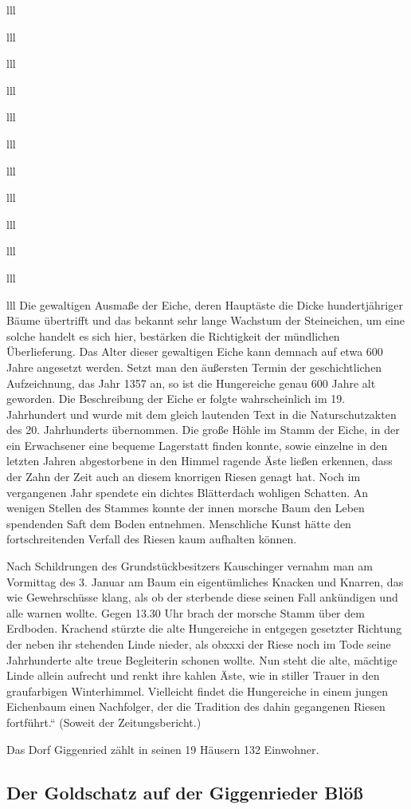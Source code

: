 \documentclass[12pt,a4pager]{book}
\begin{document}
\begin{tabuluar}{lll}
\begin{tabuluar}{lll}
\begin{tabuluar}{lll}
\begin{tabuluar}{lll}
\begin{tabuluar}{lll}
\begin{tabuluar}{lll}
\begin{tabuluar}{lll}
\begin{tabuluar}{lll}
\begin{tabuluar}{lll}
\begin{tabuluar}{lll}
\begin{tabuluar}{lll}
\begin{tabuluar}{lll}
Die gewaltigen Ausmaße der Eiche, deren Hauptäste die Dicke hundertjähriger
Bäume übertrifft und das bekannt sehr lange Wachstum der Steineichen, um eine
solche handelt es sich hier, bestärken die Richtigkeit der mündlichen
Überlieferung. Das Alter dieser gewaltigen Eiche kann demnach auf etwa 600 Jahre
angesetzt werden. Setzt man den äußersten Termin der geschichtlichen
Aufzeichnung, das Jahr 1357 an, so ist die Hungereiche genau 600 Jahre alt
geworden. Die Beschreibung der Eiche er folgte wahrscheinlich im 19. Jahrhundert
und wurde mit dem gleich lautenden Text in die Naturschutzakten des 20.
Jahrhunderts übernommen. Die große Höhle im Stamm der Eiche, in der ein
Erwachsener eine bequeme Lagerstatt finden konnte, sowie einzelne in den letzten
Jahren abgestorbene in den Himmel ragende Äste ließen erkennen, dass der Zahn
der Zeit auch an diesem knorrigen Riesen genagt hat. Noch im vergangenen Jahr
spendete ein dichtes Blätterdach wohligen Schatten. An wenigen Stellen des
Stammes konnte der innen morsche Baum den Leben spendenden Saft dem Boden
entnehmen. Menschliche Kunst hätte den fortschreitenden Verfall des Riesen kaum
aufhalten können.

Nach Schildrungen des Grundstückbesitzers Kauschinger vernahm man am Vormittag
des 3. Januar am Baum ein eigentümliches Knacken und Knarren, das wie
Gewehrschüsse klang, als ob der sterbende diese seinen Fall ankündigen und alle
warnen wollte. Gegen 13.30 Uhr brach der morsche Stamm über dem Erdboden.
Krachend stürzte die alte Hungereiche in entgegen gesetzter Richtung der neben
ihr stehenden Linde nieder, als obxxxi der Riese noch im Tode seine Jahrhunderte
alte treue Begleiterin schonen wollte. Nun steht die alte, mächtige Linde allein
aufrecht und renkt ihre kahlen Äste, wie in stiller Trauer in den graufarbigen
Winterhimmel. Vielleicht findet die Hungereiche in einem jungen Eichenbaum einen
Nachfolger, der die Tradition des dahin gegangenen Riesen fortführt.“ (Soweit
der Zeitungsbericht.)

Das Dorf Giggenried zählt in seinen 19 Häusern 132 Einwohner.

\subsection{Der Goldschatz auf der Giggenrieder Blöß}


\end{tabuluar}
\end{tabuluar}
\end{tabuluar}
\end{tabuluar}
\end{tabuluar}
\end{tabuluar}
\end{tabuluar}
\end{tabuluar}
\end{tabuluar}
\end{tabuluar}
\end{tabuluar}
\end{tabuluar}
\end{document}

